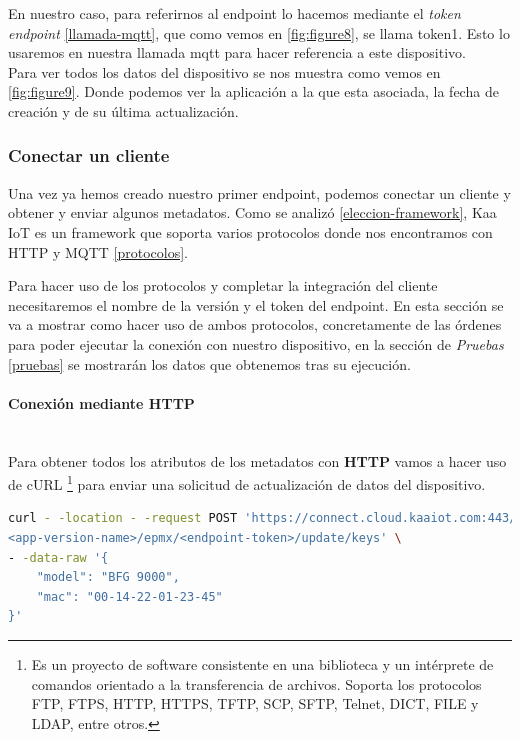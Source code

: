 {En nuestro caso, para referirnos al endpoint lo hacemos mediante el \textit{token endpoint} \ref{llamada-mqtt}, que como vemos en \ref{fig:figure8}, se llama token1. Esto lo usaremos en nuestra llamada mqtt para hacer referencia a este dispositivo.\\

Para ver todos los datos del dispositivo se nos muestra como vemos en \ref{fig:figure9}. Donde podemos ver la aplicación a la que esta asociada, la fecha de creación y de su última actualización.

\newpage

\subsubsection{Conectar un cliente}

Una vez ya hemos creado nuestro primer endpoint, podemos conectar un cliente y obtener y enviar algunos metadatos. Como se analizó \ref{eleccion-framework}, Kaa IoT es un framework que soporta varios protocolos donde nos encontramos con HTTP y MQTT \ref{protocolos}.

Para hacer uso de los protocolos y completar la integración del cliente necesitaremos el nombre de la versión y el token del endpoint. En esta sección se va a mostrar como hacer uso de ambos protocolos, concretamente de las órdenes para poder ejecutar la conexión con nuestro dispositivo, en la sección de \textit{Pruebas} \ref{pruebas} se mostrarán los datos que obtenemos tras su ejecución.\\

\paragraph{Conexión mediante HTTP} \label{http-connection} \hspace{0pt} \\

Para obtener todos los atributos de los metadatos con \textbf{HTTP} vamos a hacer uso de cURL \footnote{Es un proyecto de software consistente en una biblioteca y un intérprete de comandos orientado a la transferencia de archivos. Soporta los protocolos FTP, FTPS, HTTP, HTTPS, TFTP, SCP, SFTP, Telnet, DICT, FILE y LDAP, entre otros.} para enviar una solicitud de actualización de datos del dispositivo.

\begin{lstlisting}[language=bash]
curl - -location - -request POST 'https://connect.cloud.kaaiot.com:443/kp1/
<app-version-name>/epmx/<endpoint-token>/update/keys' \
- -data-raw '{
    "model": "BFG 9000",
    "mac": "00-14-22-01-23-45"
}'
\end{lstlisting}

}
